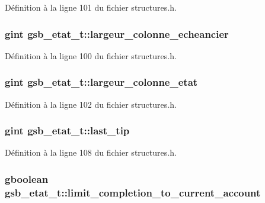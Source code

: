 Définition à la ligne 101 du fichier structures.h.

\subsubsection[{largeur\_\-colonne\_\-echeancier}]{\setlength{\rightskip}{0pt plus 5cm}gint {\bf gsb\_\-etat\_\-t::largeur\_\-colonne\_\-echeancier}}\label{structgsb__etat__t_a9d04582aa25fe395e17afb07af18405a}


Définition à la ligne 100 du fichier structures.h.

\subsubsection[{largeur\_\-colonne\_\-etat}]{\setlength{\rightskip}{0pt plus 5cm}gint {\bf gsb\_\-etat\_\-t::largeur\_\-colonne\_\-etat}}\label{structgsb__etat__t_aabb26bfc1a0218e04089d46dd495e02a}


Définition à la ligne 102 du fichier structures.h.

\subsubsection[{last\_\-tip}]{\setlength{\rightskip}{0pt plus 5cm}gint {\bf gsb\_\-etat\_\-t::last\_\-tip}}\label{structgsb__etat__t_af10296b248b4be892fcb555fd4c12f44}


Définition à la ligne 108 du fichier structures.h.

\subsubsection[{limit\_\-completion\_\-to\_\-current\_\-account}]{\setlength{\rightskip}{0pt plus 5cm}gboolean {\bf gsb\_\-etat\_\-t::limit\_\-completion\_\-to\_\-current\_\-account}}\label{structgsb__etat__t_a061061ce7c3655a4e088acc4481fd71d}


